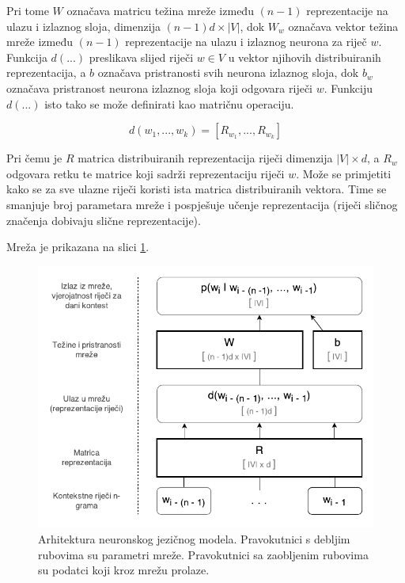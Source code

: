 \documentclass[times, utf8, diplomski, numeric]{fer}
\begin{document}
Pri tome $W$ označava matricu težina  mreže između $(n - 1)$ reprezentacije na ulazu i izlaznog sloja, dimenzija $(n - 1) d \times |V|$, dok $W_w$ označava vektor težina mreže između $(n - 1)$ reprezentacije na ulazu i izlaznog neurona za riječ $w$. Funkcija $d(...)$ preslikava slijed riječi $w \in V$ u vektor njihovih distribuiranih reprezentacija, a $b$ označava pristranosti  svih neurona izlaznog sloja, dok $b_w$ označava pristranost neurona izlaznog sloja koji odgovara riječi $w$. Funkciju $d(...)$ isto tako se može definirati kao matričnu operaciju.

\begin{equation}
\label{eq:d_func}
d(w_1, ..., w_k) = \left[R_{w_1}, ..., R_{w_k}\right]
\end{equation}

Pri čemu je $R$ matrica distribuiranih reprezentacija  riječi dimenzija $|V| \times d$, a $R_w$ odgovara retku te matrice koji sadrži reprezentaciju riječi $w$. Može se primjetiti kako se za sve ulazne riječi koristi ista matrica distribuiranih vektora. Time se smanjuje broj parametara mreže i pospješuje učenje reprezentacija (riječi sličnog značenja dobivaju slične reprezentacije).

Mreža je prikazana na slici \ref{fig:nnet}.

\begin{figure}[!htb]
\centering
\includegraphics{fig/nnet.pdf}
\caption{Arhitektura neuronskog jezičnog modela. Pravokutnici s debljim rubovima su parametri mreže. Pravokutnici sa zaobljenim rubovima su podatci koji kroz mrežu prolaze.}
\label{fig:nnet}
\end{figure}
\end{document}
